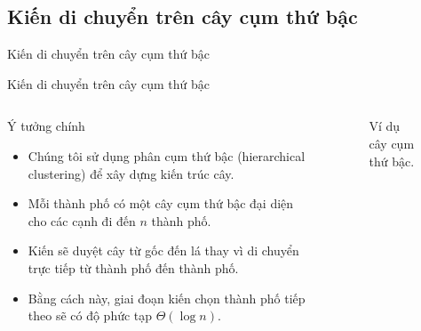 \documentclass[aspectratio=169]{beamer}
\begin{document}
\subsection{Kiến di chuyển trên cây cụm thứ bậc}
\begin{frame}{Kiến di chuyển trên cây cụm thứ bậc}
    \vspace{0.1cm}
    \centering
    
\end{frame}

\begin{frame}{Kiến di chuyển trên cây cụm thứ bậc}
    \begin{columns}
        \begin{column}{0.55\textwidth}
            \begin{block}{Ý tưởng chính}
                \vspace{0.1cm}
                \begin{itemize}
                    \justifying
                    \item Chúng tôi sử dụng phân cụm thứ bậc (hierarchical clustering) để xây dựng kiến trúc cây.
                    \item Mỗi thành phố có một cây cụm thứ bậc đại diện cho các cạnh đi đến $n$ thành phố.
                    \item Kiến sẽ duyệt cây từ gốc đến lá thay vì di chuyển trực tiếp từ thành phố đến thành phố.
                    \item Bằng cách này, giai đoạn kiến chọn thành phố tiếp theo sẽ có độ phức tạp $\Theta(\log n)$.
                \end{itemize}
                \vspace{0.1cm}
            \end{block}
        \end{column}
        \begin{column}{0.45\textwidth}
            \begin{figure}
                \vspace{0.1cm}
                \centering
                
                \caption{Ví dụ cây cụm thứ bậc.}
            \end{figure}
        \end{column}
    \end{columns}
\end{frame}
\end{document}
